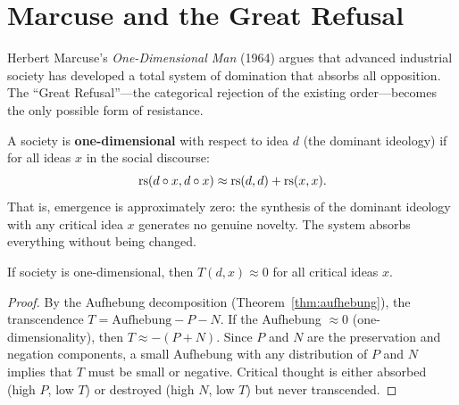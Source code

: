 \section{Marcuse and the Great Refusal}

Herbert Marcuse's \textit{One-Dimensional Man} (1964) argues that advanced
industrial society has developed a total system of domination that absorbs
all opposition. The ``Great Refusal''---the categorical rejection of the
existing order---becomes the only possible form of resistance.

\begin{definition}
\label{def:one-dimensionality}
A society is \textbf{one-dimensional} with respect to idea $d$ (the dominant
ideology) if for all ideas $x$ in the social discourse:
\[
\mathrm{rs}(d \circ x, d \circ x) \approx \mathrm{rs}(d, d) + \mathrm{rs}(x, x).
\]
That is, emergence is approximately zero: the synthesis of the dominant
ideology with any critical idea $x$ generates no genuine novelty. The system
absorbs everything without being changed.
\end{definition}

\begin{theorem}
\label{thm:one-dim-low-t}
If society is one-dimensional, then $T(d, x) \approx 0$ for all critical
ideas $x$.
\end{theorem}

\begin{proof}
By the Aufhebung decomposition (Theorem~\ref{thm:aufhebung}), the
transcendence $T = \mathrm{Aufhebung} - P - N$. If the Aufhebung $\approx 0$
(one-dimensionality), then $T \approx -(P + N)$. Since $P$ and $N$ are the
preservation and negation components, a small Aufhebung with any distribution
of $P$ and $N$ implies that $T$ must be small or negative. Critical thought
is either absorbed (high $P$, low $T$) or destroyed (high $N$, low $T$) but
never transcended.
\end{proof}

